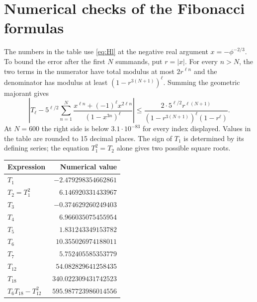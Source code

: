 \documentclass[11pt,a4paper]{article}
\theoremstyle{definition}
\theoremstyle{remark}
\numberwithin{equation}{section}
\begin{document}
\section{Numerical checks of the Fibonacci formulas}\label{sec:numerics}
The numbers in the table use \eqref{eq:Hl} at the negative real argument $x=-\phi^{-2/3}$. To bound the error after the first $N$ summands, put $r=|x|$. For every $n>N$, the two terms in the numerator have total modulus at most $2r^{\ell n}$ and the denominator has modulus at least $(1-r^{3(N+1)})^\ell$. Summing the geometric majorant gives
\[
 \left|T_\ell-5^{\ell/2}\sum_{n=1}^N
 \frac{x^{\ell n}+(-1)^\ell x^{2\ell n}}{(1-x^{3n})^\ell}\right|
 \leq\frac{2\cdot5^{\ell/2}r^{\ell(N+1)}}{(1-r^{3(N+1)})^\ell(1-r^\ell)} .
\]
At $N=600$ the right side is below $3.1\cdot10^{-83}$ for every index displayed. Values in the table are rounded to 15 decimal places. The sign of $T_1$ is determined by its defining series; the equation $T_1^2=T_2$ alone gives two possible square roots.
\begin{center}
\begin{tabular}{@{}lr@{}}\toprule
Expression & Numerical value\\\midrule
$T_1$ & $-2.479298354662861$\\
$T_2=T_1^2$ & $6.146920331433967$\\
$T_3$ & $-0.374629260249403$\\
$T_4$ & $6.966035075455954$\\
$T_5$ & $1.831243349153782$\\
$T_6$ & $10.355026974188011$\\
$T_7$ & $5.752405585353779$\\
$T_{12}$ & $54.082829641258435$\\
$T_{18}$ & $340.022309431742523$\\
$T_6T_{18}-T_{12}^2$ & $595.987723986014556$\\\bottomrule
\end{tabular}
\end{center}
\end{document}
